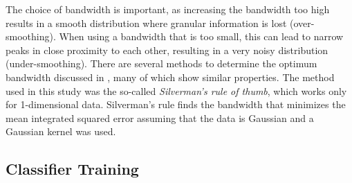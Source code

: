 The choice of bandwidth is important, as increasing the bandwidth too high results in a smooth distribution where granular information is lost (over-smoothing). When using a bandwidth that is too small, this can lead to narrow peaks in close proximity to each other, resulting in a very noisy distribution (under-smoothing). There are several methods to determine the optimum bandwidth discussed in \cite{bandwidth-selection-methods}, many of which show similar properties. The method used in this study was the so-called \textit{Silverman's rule of thumb}, which works only for 1-dimensional data. Silverman's rule finds the bandwidth that minimizes the mean integrated squared error assuming that the data is Gaussian and a Gaussian kernel was used.

\subsection{Classifier Training}





